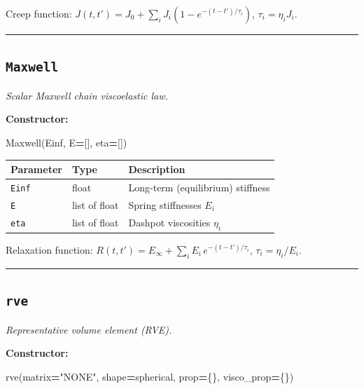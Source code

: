 \documentclass[
  a4paper,
  numbers=noendperiod,
  DIV=12]{scrreprt}
\newenvironment{Shaded}{\begin{snugshade}}{\end{snugshade}}
\newcommand{\NormalTok}[1]{#1}
\newcommand{\OperatorTok}[1]{\textcolor[rgb]{0.81,0.36,0.00}{\textbf{#1}}}
\newcommand{\StringTok}[1]{\textcolor[rgb]{0.31,0.60,0.02}{#1}}
\newcounter{none} %
\begin{document}
Creep function:
\(J(t,t') = J_0 + \sum_i J_i\left(1 - e^{-(t-t')/\tau_i}\right)\),
\(\tau_i = \eta_i J_i\).

\begin{center}\rule{0.5\linewidth}{0.5pt}\end{center}

\subsection{\texorpdfstring{\texttt{Maxwell}}{Maxwell}}\label{api-Maxwell}

\emph{Scalar Maxwell chain viscoelastic law.}

\textbf{Constructor:}

\begin{Shaded}
\begin{Highlighting}[]
\NormalTok{Maxwell(Einf, E}\OperatorTok{=}\NormalTok{[], eta}\OperatorTok{=}\NormalTok{[])}
\end{Highlighting}
\end{Shaded}

{\def\LTcaptype{none} %
\begin{longtable}[]{@{}lll@{}}
\toprule\noalign{}
Parameter & Type & Description \\
\midrule\noalign{}
\endhead
\bottomrule\noalign{}
\endlastfoot
\texttt{Einf} & float & Long-term (equilibrium) stiffness \\
\texttt{E} & list of float & Spring stiffnesses \(E_i\) \\
\texttt{eta} & list of float & Dashpot viscosities \(\eta_i\) \\
\end{longtable}
}

Relaxation function:
\(R(t,t') = E_\infty + \sum_i E_i\,e^{-(t-t')/\tau_i}\),
\(\tau_i = \eta_i/E_i\).

\begin{center}\rule{0.5\linewidth}{0.5pt}\end{center}

\subsection{\texorpdfstring{\texttt{rve}}{rve}}\label{api-rve}

\emph{Representative volume element (RVE).}

\textbf{Constructor:}

\begin{Shaded}
\begin{Highlighting}[]
\NormalTok{rve(matrix}\OperatorTok{=}\StringTok{"NONE"}\NormalTok{, shape}\OperatorTok{=}\NormalTok{spherical, prop}\OperatorTok{=}\NormalTok{\{\}, visco\_prop}\OperatorTok{=}\NormalTok{\{\})}
\end{Highlighting}
\end{Shaded}
\end{document}
